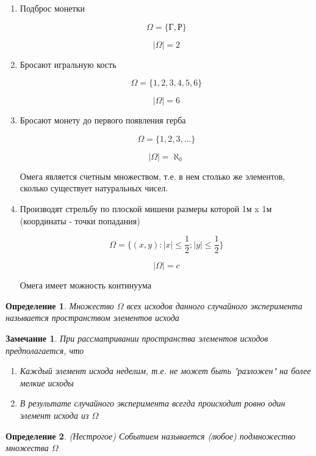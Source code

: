 \documentclass[a4paper, 14pt]{report}
\newtheorem{defenition}{Определение}[chapter]
\newtheorem{note}{Замечание}[chapter]
\begin{document}
\begin{enumerate}
    \item Подброс монетки

        $$
        \Omega = \{ \text{Г}, \text{Р}\}
        $$

        $$
        |\Omega| = 2
        $$

    \item Бросают игральную кость

        $$
        \Omega = \{ 1, 2, 3, 4, 5, 6 \}
        $$

        $$
        |\Omega| = 6
        $$

    \item Бросают монету до первого появления герба

        $$
        \Omega = \{ 1, 2, 3, \dots \}
        $$

        $$
        |\Omega| = \aleph_0
        $$

        Омега является счетным множеством, т.е. в нем столько же элементов, сколько существует натуральных чисел.

    \item Производят стрельбу по плоской мишени размеры которой 1м x 1м (координаты - точки попадания)

        $$
        \Omega = \{ (x,y) : |x| \le \frac{1}{2}; |y| \le \frac{1}{2} \}
        $$

        $$
        |\Omega| = c
        $$

        Омега имеет можность континуума
\end{enumerate}

\begin{defenition}
    Множество $\Omega$ всех исходов данного случайного эксперимента называется пространством элементов исхода
\end{defenition}

\begin{note}
    При рассматривании пространства элементов исходов предполагается, что
    \begin{enumerate}
        \item Каждый элемент исхода неделим, т.е. не может быть "разложен" на более мелкие исходы
        \item В результате случайного эксперимента всегда происходит ровно один элемент исхода из $\Omega$
    \end{enumerate}
\end{note}

\begin{defenition}
    (Нестрогое) Событием называется (любое) подмножество множества $\Omega$
\end{defenition}
\end{document}
